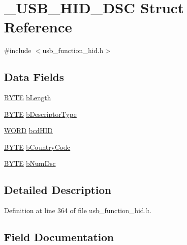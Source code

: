 \hypertarget{struct___u_s_b___h_i_d___d_s_c}{}\section{\+\_\+\+U\+S\+B\+\_\+\+H\+I\+D\+\_\+\+D\+S\+C Struct Reference}
\label{struct___u_s_b___h_i_d___d_s_c}


{\ttfamily \#include $<$usb\+\_\+function\+\_\+hid.\+h$>$}

\subsection*{Data Fields}
\begin{DoxyCompactItemize}
\item 
\hyperlink{_generic_type_defs_8h_a4ae1dab0fb4b072a66584546209e7d58}{B\+Y\+T\+E} \hyperlink{struct___u_s_b___h_i_d___d_s_c_a8e443464272fdf3bd5148df0b7f5dcaf}{b\+Length}
\item 
\hyperlink{_generic_type_defs_8h_a4ae1dab0fb4b072a66584546209e7d58}{B\+Y\+T\+E} \hyperlink{struct___u_s_b___h_i_d___d_s_c_ac1d02ce6fe165032044fb81602a9b07c}{b\+Descriptor\+Type}
\item 
\hyperlink{_generic_type_defs_8h_a2b0e863dadf920709ec53d9088ee7c91}{W\+O\+R\+D} \hyperlink{struct___u_s_b___h_i_d___d_s_c_a778de625dce37d7d465fb940d186e9c8}{bcd\+H\+I\+D}
\item 
\hyperlink{_generic_type_defs_8h_a4ae1dab0fb4b072a66584546209e7d58}{B\+Y\+T\+E} \hyperlink{struct___u_s_b___h_i_d___d_s_c_a0f6a8b12c7021b10aec7da41d61f2547}{b\+Country\+Code}
\item 
\hyperlink{_generic_type_defs_8h_a4ae1dab0fb4b072a66584546209e7d58}{B\+Y\+T\+E} \hyperlink{struct___u_s_b___h_i_d___d_s_c_a6303e823747b3ff62fb36ff93ecfba33}{b\+Num\+Dsc}
\end{DoxyCompactItemize}


\subsection{Detailed Description}


Definition at line 364 of file usb\+\_\+function\+\_\+hid.\+h.



\subsection{Field Documentation}
\hypertarget{struct___u_s_b___h_i_d___d_s_c_a778de625dce37d7d465fb940d186e9c8}{}
